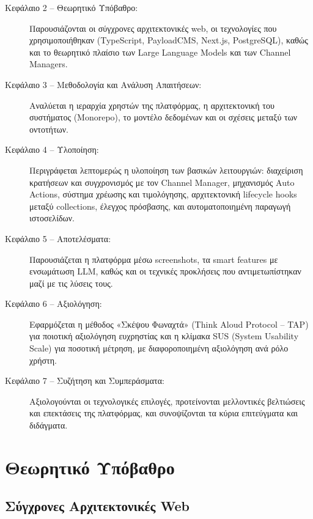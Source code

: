 \documentclass[
	12pt, %
	oneside, %
	greek,
	onehalfspacing, %
	liststotoc, %
	toctotoc, %
	parskip, %
	headsepline, %
]{MastersDoctoralThesis} %
\begin{document}
\begin{description}
    \item[Κεφάλαιο 2 -- Θεωρητικό Υπόβαθρο:] Παρουσιάζονται οι σύγχρονες αρχιτεκτονικές web, οι τεχνολογίες που χρησιμοποιήθηκαν (TypeScript, PayloadCMS, Next.js, PostgreSQL), καθώς και το θεωρητικό πλαίσιο των Large Language Models και των Channel Managers.
    
    \item[Κεφάλαιο 3 -- Μεθοδολογία και Ανάλυση Απαιτήσεων:] Αναλύεται η ιεραρχία χρηστών της πλατφόρμας, η αρχιτεκτονική του συστήματος (Monorepo), το μοντέλο δεδομένων και οι σχέσεις μεταξύ των οντοτήτων.
    
    \item[Κεφάλαιο 4 -- Υλοποίηση:] Περιγράφεται λεπτομερώς η υλοποίηση των βασικών λειτουργιών: διαχείριση κρατήσεων και συγχρονισμός με τον Channel Manager, μηχανισμός Auto Actions, σύστημα χρέωσης και τιμολόγησης, αρχιτεκτονική lifecycle hooks μεταξύ collections, έλεγχος πρόσβασης, και αυτοματοποιημένη παραγωγή ιστοσελίδων.
    
    \item[Κεφάλαιο 5 -- Αποτελέσματα:] Παρουσιάζεται η πλατφόρμα μέσω screenshots, τα smart features με ενσωμάτωση LLM, καθώς και οι τεχνικές προκλήσεις που αντιμετωπίστηκαν μαζί με τις λύσεις τους.
    
    \item[Κεφάλαιο 6 -- Αξιολόγηση:] Εφαρμόζεται η μέθοδος «Σκέψου Φωναχτά» (Think Aloud Protocol -- TAP) για ποιοτική αξιολόγηση ευχρηστίας και η κλίμακα SUS (System Usability Scale) για ποσοτική μέτρηση, με διαφοροποιημένη αξιολόγηση ανά ρόλο χρήστη.
    
    \item[Κεφάλαιο 7 -- Συζήτηση και Συμπεράσματα:] Αξιολογούνται οι τεχνολογικές επιλογές, προτείνονται μελλοντικές βελτιώσεις και επεκτάσεις της πλατφόρμας, και συνοψίζονται τα κύρια επιτεύγματα και διδάγματα.
\end{description}


\chapter{Θεωρητικό Υπόβαθρο}
\label{chap:theory}

\section{Σύγχρονες Αρχιτεκτονικές Web}
\label{sec:modern-architectures}
\end{document}
